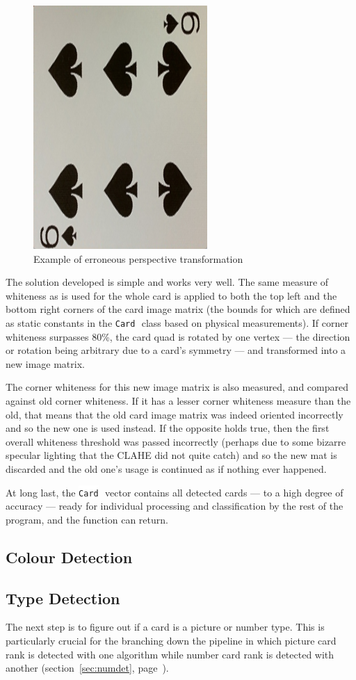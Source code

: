 \documentclass[a4paper,12pt,notitlepage]{article}
\newcommand{\secref}[1]{(section~\ref{#1}, page~\pageref{#1})}
\newcommand{\code}[1]{\colorbox{white}{\lstinline[basicstyle=\ttfamily\color{black}]|#1|} }
\begin{document}
\begin{figure}[H]
				\includegraphics[width=0.3\linewidth]{rot4}
				\caption{Example of erroneous perspective transformation}
				\label{fig:rot}
			\end{figure}

			The solution developed is simple and works very well. The same measure of whiteness as is used for the whole card is applied to both the top left and the bottom right corners of the card image matrix (the bounds for which are defined as static constants in the \code{Card} class based on physical measurements). If corner whiteness surpasses 80\%, the card quad is rotated by one vertex --- the direction or rotation being arbitrary due to a card's symmetry --- and transformed into a new image matrix.

			The corner whiteness for this new image matrix is also measured, and compared against old corner whiteness. If it has a lesser corner whiteness measure than the old, that means that the old card image matrix was indeed oriented incorrectly and so the new one is used instead. If the opposite holds true, then the first overall whiteness threshold was passed incorrectly (perhaps due to some bizarre specular lighting that the CLAHE did not quite catch) and so the new mat is discarded and the old one's usage is continued as if nothing ever happened.

			At long last, the \code{Card} vector contains all detected cards --- to a high degree of accuracy --- ready for individual processing and classification by the rest of the program, and the function can return.
	\subsection{Colour Detection}
		
	\subsection{Type Detection}
		\label{sec:typedet}
		The next step is to figure out if a card is a picture or number type. This is particularly crucial for the branching down the pipeline in which picture card rank is detected with one algorithm while number card rank is detected with another \secref{sec:numdet}.
\end{document}
